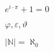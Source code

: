 \documentclass[12pt, a4paper]{article}
\begin{document}
$e ^{i\cdot\pi} + 1 = 0$


$\varphi, \varepsilon, \vartheta$


$|\mathbb{N}|  = \aleph _0   $
\end{document}
